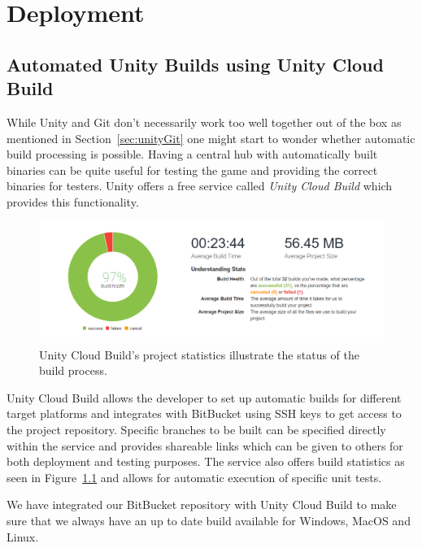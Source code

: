 \chapter{Deployment}
\label{chap:deployment}

\section{Automated Unity Builds using Unity Cloud Build}
While Unity and Git don't necessarily work too well together out of the box as mentioned in Section~\ref{sec:unityGit} one might start to wonder whether automatic build processing is possible. Having a central hub with automatically built binaries can be quite useful for testing the game and providing the correct binaries for testers. Unity offers a free service called \emph{Unity Cloud Build} which provides this functionality. 

\begin{figure}[tbph]  %
  \centering
  \includegraphics[width=\textwidth]{images/unityCloudBuildStats}
  \caption[Project statistics from Unity Cloud Build]{Unity Cloud Build's project statistics illustrate the status of the build process.}
  \label{fig:unityCloudStats}
\end{figure}

Unity Cloud Build allows the developer to set up automatic builds for different target platforms and integrates with BitBucket using SSH keys to get access to the project repository. Specific branches to be built can be specified directly within the service and provides shareable links which can be given to others for both deployment and testing purposes. The service also offers build statistics as seen in Figure~\ref{fig:unityCloudStats} and allows for automatic execution of specific unit tests. 

We have integrated our BitBucket repository with Unity Cloud Build to make sure that we always have an up to date build available for Windows, MacOS and Linux. 

